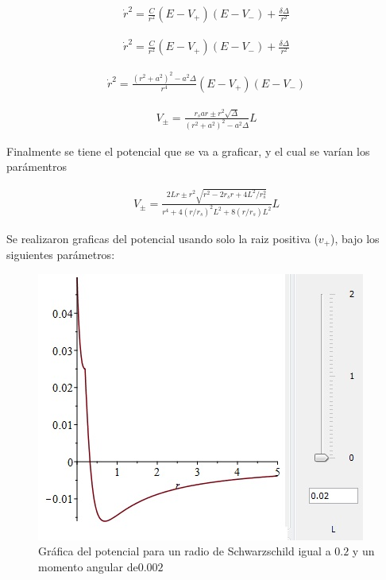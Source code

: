 \documentclass{article}
\begin{document}
\begin{align}
    \dot{r}^2 = \frac{C}{r^2}(E-V_{+})(E-V_{-})+ \frac{\delta \Delta}{r^2}
\end{align}



\begin{align}
    \dot{r}^2 = \frac{C}{r^2}(E-V_{+})(E-V_{-})+ \frac{\delta \Delta}{r^2}
\end{align}




\begin{align}
    \dot{r}^2= \frac{(r^2+a^2)^2-a^2\Delta}{r^4}(E-V_{+})(E-V_{-})
\end{align}



\begin{align}
    V_{\pm} = \frac{r_{s}ar\pm r^2 \sqrt{\Delta}}{(r^2+a^2)^2 -a^2\Delta}L
\end{align}

Finalmente se tiene el potencial que se va a graficar, y el cual se varían los parámentros

\begin{align}
    V_{\pm} =\frac{2Lr \pm r^2\sqrt{r^2-2r_{s}r+4L^2/r_{s}^2}}{r^4+4(r/r_{s})^2L^2+8(r/r_{s})L^2}L
\end{align}

Se realizaron graficas del potencial usando solo la raiz positiva ($v_+$), bajo los siguientes parámetros:

\begin{figure}[H]
\centering
\includegraphics[scale=0.7]{rs=02,L=002.jpg}  \caption{Gráfica del potencial para un radio de Schwarzschild igual a $0.2$ y un momento angular de$0.002$}\label{002}
\end{figure}
\end{document}
